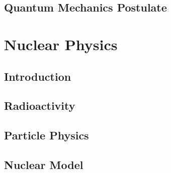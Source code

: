 \documentclass[10pt]{report}
\begin{document}
\section{Quantum Mechanics Postulate}
\clearpage
\clearpage

\chapter{Nuclear Physics}\clearpage
\section{Introduction}
\clearpage

\section{Radioactivity}
\clearpage

\section{Particle Physics}
\clearpage

\section{Nuclear Model}
\clearpage

\nocite{*}
\printbibliography
\end{document}
